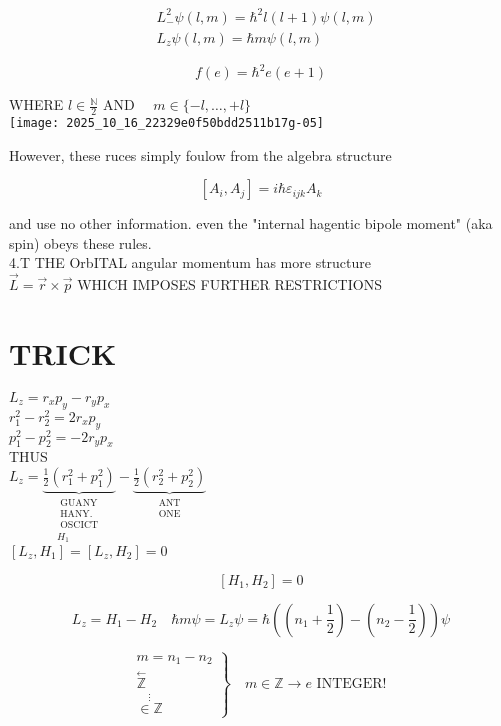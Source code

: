$$
\begin{aligned}
& L_{-}^{2} \psi(l, m)=\hbar^{2} l(l+1) \psi(l, m) \\
& L_{z} \psi(l, m)=\hbar m \psi(l, m)
\end{aligned}
$$

$$
f(e)=\hbar^{2} e(e+1)
$$

WHERE $l \in \frac{\mathbb{N}}{2}$ AND $\quad m \in\{-l, \ldots,+l\}$\\
\texttt{[image: 2025\_10\_16\_22329e0f50bdd2511b17g-05]}

However, these ruces simply foulow from the algebra structure

$$
\left[A_{i}, A_{j}\right]=i \hbar \varepsilon_{i j k} A_{k}
$$

and use no other information. even the "internal hagentic bipole moment" (aka spin) obeys these rules.\\
4.T THE OrbITAL angular momentum has more structure\\
$\vec{L}=\vec{r} \times \vec{p}$ WHICH IMPOSES FURTHER RESTRICTIONS

\section*{TRICK}
$L_{z}=r_{x} p_{y}-r_{y} p_{x}$\\
$r_{1}^{2}-r_{2}^{2}=2 r_{x} p_{y}$\\
$p_{1}^{2}-p_{2}^{2}=-2 r_{y} p_{x}$\\
THUS\\
$L_{z}=\underbrace{\frac{1}{2}\left(r_{1}^{2}+p_{1}^{2}\right)}_{\substack{\text { GUANY } \\ \text { HANY. } \\ \text { OSCICT } \\ H_{1}}}-\underbrace{\frac{1}{2}\left(r_{2}^{2}+p_{2}^{2}\right)}_{\substack{\text { ANT } \\ \text { ONE }}}$\\
$\left[L_{z}, H_{1}\right]=\left[L_{z}, H_{2}\right]=0$

$$
\left[H_{1}, H_{2}\right]=0
$$

$$
L_{z}=H_{1}-H_{2} \quad \hbar m \psi=L_{z} \psi=\hbar\left(\left(n_{1}+\frac{1}{2}\right)-\left(n_{2}-\frac{1}{2}\right)\right) \psi
$$

$$
\left.\begin{array}{c}
m=n_{1}-n_{2} \\
\stackrel{\leftarrow}{\mathbb{Z}} \\
\stackrel{\vdots}{\in \mathbb{Z}}
\end{array}\right\} \quad m \in \mathbb{Z} \rightarrow e \text { INTEGER! }
$$

